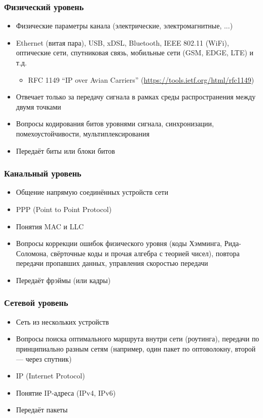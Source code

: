 \documentclass[xetex,mathserif,serif]{beamer}
\begin{document}
	\begin{frame}
		\frametitle{Физический уровень}
		\begin{itemize}
			\item Физические параметры канала (электрические, электромагнитные, ...)
			\item Ethernet (витая пара), USB, xDSL, Bluetooth, IEEE 802.11 (WiFi), оптические сети, спутниковая связь, мобильные сети (GSM, EDGE, LTE) и т.д.
			\begin{itemize}
				\item RFC 1149 ``IP over Avian Carriers'' (\url{https://tools.ietf.org/html/rfc1149})
			\end{itemize}
			\item Отвечает только за передачу сигнала в рамках среды распространения между двумя точками
			\item Вопросы кодирования битов уровнями сигнала, синхронизации, помехоустойчивости, мультиплексирования
			\item Передаёт биты или блоки битов
		\end{itemize}
	\end{frame}

	\begin{frame}
		\frametitle{Канальный уровень}
		\begin{itemize}
			\item Общение напрямую соединённых устройств сети
			\item PPP (Point to Point Protocol)
			\item Понятия MAC и LLC
			\item Вопросы коррекции ошибок физического уровня (коды Хэмминга, Рида-Соломона, свёрточные коды и прочая алгебра с теорией чисел), повтора передачи пропавших данных, управления скоростью передачи
			\item Передаёт фрэймы (или кадры)
		\end{itemize}
	\end{frame}

	\begin{frame}
		\frametitle{Сетевой уровень}
		\begin{itemize}
			\item Сеть из нескольких устройств
			\item Вопросы поиска оптимального маршрута внутри сети (роутинга), передачи по принципиально разным сетям (например, один пакет по оптоволокну, второй --- через спутник)
			\item IP (Internet Protocol)
			\item Понятие IP-адреса (IPv4, IPv6)
			\item Передаёт пакеты
		\end{itemize}
	\end{frame}
\end{document}
